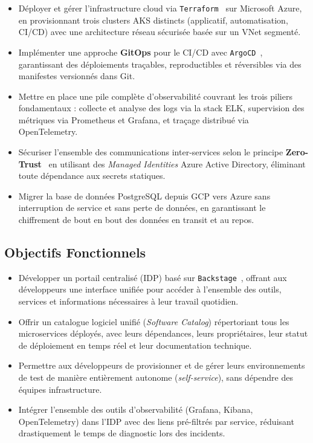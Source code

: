 \begin{itemize}[itemsep=0.2cm, topsep=0.3cm]
  \item Déployer et gérer l'infrastructure cloud via \texttt{Terraform}~\cite{hashicorp2023terraform} sur Microsoft Azure, en provisionnant trois clusters \ac{AKS} distincts (applicatif, automatisation, CI/CD) avec une architecture réseau sécurisée basée sur un \ac{VNet} segmenté.
  \item Implémenter une approche \textbf{GitOps} pour le \ac{CI/CD} avec \texttt{ArgoCD}~\cite{argocd2023docs}, garantissant des déploiements traçables, reproductibles et réversibles via des manifestes versionnés dans Git.
  \item Mettre en place une pile complète d'observabilité couvrant les trois piliers fondamentaux : collecte et analyse des logs via la stack ELK, supervision des métriques via Prometheus et Grafana, et traçage distribué via OpenTelemetry.
  \item Sécuriser l'ensemble des communications inter-services selon le principe \textbf{Zero-Trust}~\cite{nist2020zerotrust} en utilisant des \textit{Managed Identities} Azure Active Directory, éliminant toute dépendance aux secrets statiques.
  \item Migrer la base de données PostgreSQL depuis \ac{GCP} vers Azure sans interruption de service et sans perte de données, en garantissant le chiffrement de bout en bout des données en transit et au repos.
\end{itemize}

\subsection{Objectifs Fonctionnels}

\begin{itemize}[itemsep=0.2cm, topsep=0.3cm]
  \item Développer un portail centralisé (\ac{IDP}) basé sur \texttt{Backstage}~\cite{backstage2023docs}, offrant aux développeurs une interface unifiée pour accéder à l'ensemble des outils, services et informations nécessaires à leur travail quotidien.
  \item Offrir un catalogue logiciel unifié (\textit{Software Catalog}) répertoriant tous les microservices déployés, avec leurs dépendances, leurs propriétaires, leur statut de déploiement en temps réel et leur documentation technique.
  \item Permettre aux développeurs de provisionner et de gérer leurs environnements de test de manière entièrement autonome (\textit{self-service}), sans dépendre des équipes infrastructure.
  \item Intégrer l'ensemble des outils d'observabilité (Grafana, Kibana, OpenTelemetry) dans l'\ac{IDP} avec des liens pré-filtrés par service, réduisant drastiquement le temps de diagnostic lors des incidents.
\end{itemize}


